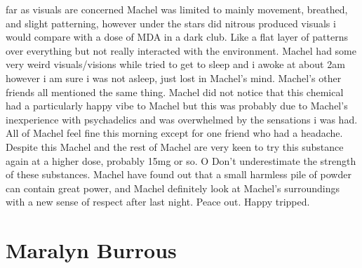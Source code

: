 \documentclass[12pt]{book}
\begin{document}
far as visuals are concerned Machel was limited to mainly movement, breathed, and slight patterning, however under the stars did nitrous produced visuals i would compare with a dose of MDA in a dark club. Like a flat layer of patterns over everything but not really interacted with the environment. Machel had some very weird visuals/visions while tried to get to sleep and i awoke at about 2am however i am sure i was not asleep, just lost in Machel's mind. Machel's other friends all mentioned the same thing. Machel did not notice that this chemical had a particularly happy vibe to Machel but this was probably due to Machel's inexperience with psychadelics and was overwhelmed by the sensations i was had. All of Machel feel fine this morning except for one friend who had a headache. Despite this Machel and the rest of Machel are very keen to try this substance again at a higher dose, probably 15mg or so. O Don't underestimate the strength of these substances. Machel have found out that a small harmless pile of powder can contain great power, and Machel definitely look at Machel's surroundings with a new sense of respect after last night. Peace out. Happy tripped.



\chapter{Maralyn Burrous}
\end{document}
